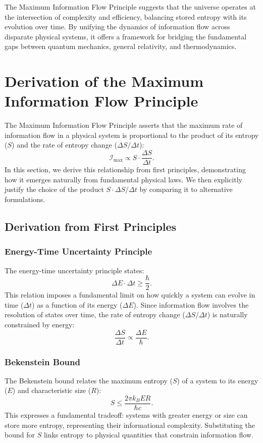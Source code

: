 \documentclass[12pt]{article}
\begin{document}
The Maximum Information Flow Principle suggests that the universe operates at the intersection of complexity and efficiency, balancing stored entropy with its evolution over time. By unifying the dynamics of information flow across disparate physical systems, it offers a framework for bridging the fundamental gaps between quantum mechanics, general relativity, and thermodynamics.


\section{Derivation of the Maximum Information Flow Principle}
\label{sec:hypothesis}

The Maximum Information Flow Principle asserts that the maximum rate of information flow in a physical system is proportional to the product of its entropy (\( S \)) and the rate of entropy change (\( \Delta S / \Delta t \)):
\[
\mathcal{I}_{\text{max}} \propto S \cdot \frac{\Delta S}{\Delta t}.
\]
In this section, we derive this relationship from first principles, demonstrating how it emerges naturally from fundamental physical laws. We then explicitly justify the choice of the product \( S \cdot \Delta S / \Delta t \) by comparing it to alternative formulations.

\subsection{Derivation from First Principles}
\subsubsection{Energy-Time Uncertainty Principle}
The energy-time uncertainty principle states:
\[
\Delta E \cdot \Delta t \geq \frac{\hbar}{2}.
\]
This relation imposes a fundamental limit on how quickly a system can evolve in time (\( \Delta t \)) as a function of its energy (\( \Delta E \)). Since information flow involves the resolution of states over time, the rate of entropy change (\( \Delta S / \Delta t \)) is naturally constrained by energy:
\[
\frac{\Delta S}{\Delta t} \propto \frac{\Delta E}{\hbar}.
\]

\subsubsection{Bekenstein Bound}
The Bekenstein bound relates the maximum entropy (\( S \)) of a system to its energy (\( E \)) and characteristic size (\( R \)):
\[
S \leq \frac{2 \pi k_B E R}{\hbar c}.
\]
This expresses a fundamental tradeoff: systems with greater energy or size can store more entropy, representing their informational complexity. Substituting the bound for \( S \) links entropy to physical quantities that constrain information flow.
\end{document}

